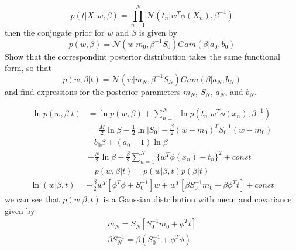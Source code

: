 \documentclass[a4paper]{article}
\begin{document}
\begin{enumerate}
		\begin{equation*}
			p(t|X,w,\beta)=\prod_{n = 1}^{N}\mathcal{N}(t_n|w^T\phi(X_n),\beta^{-1})
		\end{equation*}
		then the conjugate prior for $w$ and $\beta$ is given by
		\begin{equation*}
			p(w,\beta)=\mathcal{N}(w|m_0,\beta^{-1}S_0)Gam(\beta|a_0,b_0)
		\end{equation*}
		Show that the correspondint posterior distribution takes the same functional form, so that
		\begin{equation*}
			p(w,\beta|t)=\mathcal{N}(w|m_N,\beta^{-1}S_N)Gam(\beta|a_N,b_N)
		\end{equation*}
		and find expressions for the posterior parameters $m_N$, $S_N$, $a_N$, and $b_N$.
		\begin{solution}
			\begin{equation*}
				\begin{aligned}
				\ln p(w,\beta|t)
				&=\ln p(w,\beta) + \sum_{n = 1}^{N} \ln p(t_n|w^T\phi(x_n),\beta^{-1})\\
				&=\frac{M}{2}\ln \beta-\frac{1}{2}\ln |S_0| - \frac{\beta}{2}(w-m_0)^TS_0^{-1}(w-m_0)\\
				&-b_0\beta +(a_0-1)\ln \beta\\
				&+\frac{N}{2}\ln \beta-\frac{\beta}{2}\sum_{n=1}^{N}\{w^T\phi(x_n)-t_n\}^2+const
				\end{aligned}
			\end{equation*}
			\begin{equation*}
				\begin{aligned}
					p(w,\beta|t)=p(w|\beta,t)p(\beta|t)
				\end{aligned}
			\end{equation*}
			\begin{equation*}
				\begin{aligned}
				\ln (w|\beta,t) = -\frac{\beta}{2}w^T [\phi^T \phi + S_0^{-1}]w + w^T[\beta S_0^{-1}m_0 + \beta\phi^Tt] + const
				\end{aligned}
			\end{equation*}
			we can see that $p(w|\beta,t)$ is a Gaussian distribution with mean and covariance given by
			\begin{equation*}
				\begin{aligned}
				m_N = S_N[S_0^{-1}m_0+\phi^Tt] \\
				\beta S_N^{-1} = \beta(S_0^{-1} +\phi^T\phi)
				\end{aligned}
			\end{equation*}

\end{solution}
\end{enumerate}
\end{document}
